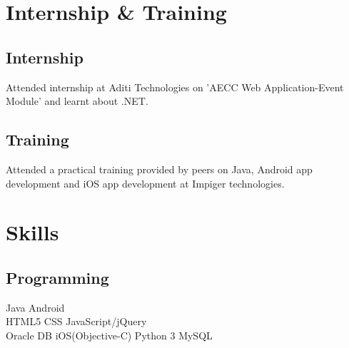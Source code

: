 \documentclass[a4paper]{srika-resume} %
\begin{document}
\begin{minipage}[t]{0.35\textwidth}

\section{Internship \& Training}

\subsection {Internship}

Attended internship at Aditi Technologies on 'AECC Web Application-Event Module' and learnt about .NET.

\sectionspace %

\subsection {Training}

Attended a practical training provided by peers on Java, Android app development and iOS app development at Impiger technologies.

\sectionspace %


\section{Skills}

\subsection{Programming}

Java \textbullet{} Android \\
HTML5 \textbullet{} CSS \textbullet{} JavaScript/jQuery \\
Oracle DB \textbullet{} iOS(Objective-C) \textbullet{} Python 3 \textbullet{} MySQL

\sectionspace %


\end{minipage} %
\end{document}
